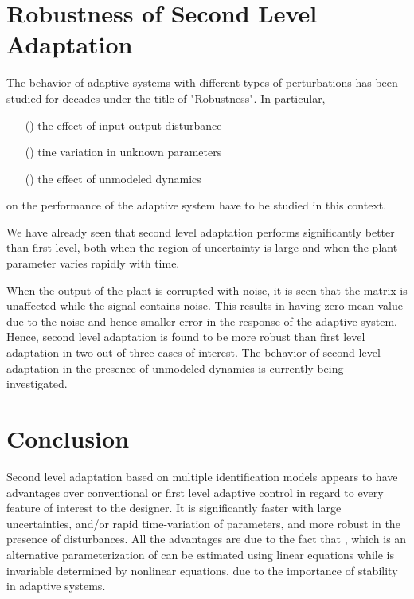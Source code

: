 \documentclass[conference]{IEEEtran}
\begin{document}
\section{Robustness of Second Level Adaptation}
The behavior of adaptive systems with different types of perturbations has been studied for decades under the title of "Robustness". In particular,
\begin{itemize}
\item [(\expandafter{\romannumeral1})] the effect of input output disturbance
\item [(\expandafter{\romannumeral2})] tine variation in unknown parameters
\item [(\expandafter{\romannumeral3})] the effect of unmodeled dynamics
\end{itemize}
on the performance of the adaptive system have to be studied in this context.

We have already seen that second level adaptation performs significantly better than first level, both when the region of uncertainty is large and when the plant parameter varies rapidly with time.

When the output of the plant is corrupted with noise, it is seen that the matrix  is unaffected while the signal  contains noise. This results in  having zero mean value due to the noise and hence smaller error in the response of the adaptive system. Hence, second level adaptation is found to be more robust than first level adaptation in two out of three cases of interest. The behavior of second level adaptation in the presence of unmodeled dynamics is currently being investigated.

\section{Conclusion}
Second level adaptation based on multiple identification models appears to have advantages over conventional or first level adaptive control in regard to every feature of interest to the designer. It is significantly faster with large uncertainties, and/or rapid time-variation of parameters, and more robust in the presence of disturbances. All the advantages are due to the fact that , which is an alternative parameterization of  can be estimated using linear equations while  is invariable determined by nonlinear equations, due to the importance of stability in adaptive systems.
\end{document}
